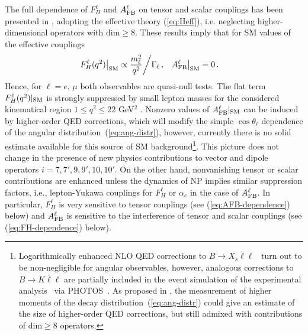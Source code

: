 \documentclass[twocolumn,epjc3]{svjour3}
\numberwithin{equation}{section}
\def \refeq#1{(\ref{#1})}
\renewcommand{\[}{\big[}
\renewcommand{\]}{\big]}
\renewcommand{\(}{\big(}
\renewcommand{\)}{\big)}
\begin{document}
The full dependence of $F_H^\ell$ and $A_{\rm FB}^\ell$ on tensor and
scalar couplings has been presented in \cite{Bobeth:2007dw,
  Bobeth:2012vn}, adopting the effective theory \refeq{eq:Heff},
i.e. neglecting higher-dimensional operators with {$\mbox{dim} \geq
  8$}. These results imply that for SM values of the effective
couplings
\begin{align}
  F_H^\ell(q^2) \big|_{\rm SM} & \propto \frac{m_\ell^2}{q^2}
    {\bigg/ \Gamma_\ell} \,, &
  A_{\rm FB}^\ell \big|_{\rm SM} & = 0 \,.
\end{align}
Hence, for $\ell = e,\, \mu$ both observables are quasi-null tests.
The flat term $F_H^\ell(q^2)|_{\rm SM}$ is strongly suppressed {by
  small lepton masses for the considered kinematical region $1 \leq
  q^2 \leq 22$ GeV$^2$} \cite{Bobeth:2007dw, Bobeth:2011nj,
  Bouchard:2013eph}.  Nonzero values of $A_{\rm FB}^\ell|_{\rm SM}$
can be induced by higher-order QED corrections, which will modify the
simple $\cos\theta_\ell$ dependence of the angular
distribution~\refeq{eq:ang-distr}, however, currently there is no
solid estimate available for this source of SM background\footnote{
  Logarithmically enhanced NLO QED corrections to $B\to X_s
  \bar\ell\ell$~\cite{Huber:2015sra} turn out to be non-negligible
  for angular observables,
  however, analogous corrections to $B\to K \bar\ell\ell$ are partially 
  included in the event simulation of the experimental 
  analysis~\cite{Aaij:2014tfa} via PHOTOS~\cite{Golonka:2005pn}. 
  As proposed in \cite{Gratrex:2015hna}, the measurement of higher
  moments of the decay distribution~\refeq{eq:ang-distr} could give an 
  estimate of the size of higher-order QED corrections, but still
  admixed with contributions of $\mbox{dim} \geq 8$ operators.}. 
This picture does not change in the presence of new physics contributions to
vector and dipole operators $i = 7,7',9,9',10,10'$. On the other hand,
nonvanishing tensor or scalar contributions are enhanced unless the dynamics of
NP implies similar suppression factors, i.e., lepton-Yukawa couplings for
$F_H^\ell$ or $\alpha_e$ in the case of $A_{\rm FB}^\ell$. In particular,
$F_H^\ell$ is very sensitive to tensor couplings (see \refeq{eq:AFB-dependence}
below) and $A_{\rm FB}^\ell$ is sensitive to the interference of tensor and
scalar couplings (see \refeq{eq:FH-dependence} below).
\end{document}
